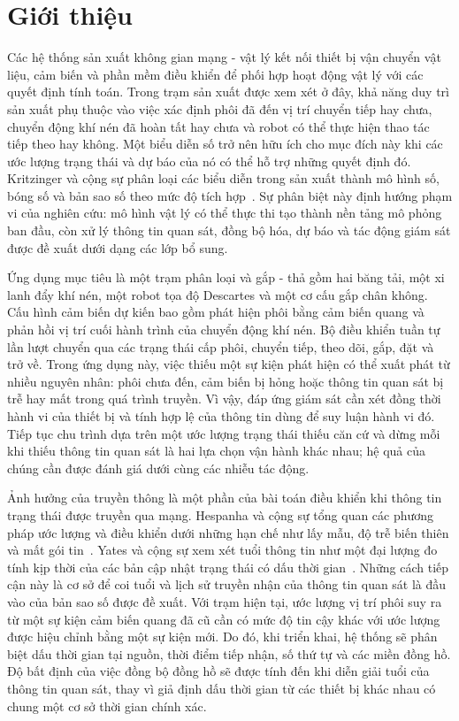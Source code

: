 \section{Giới thiệu}
Các hệ thống sản xuất không gian mạng - vật lý kết nối thiết bị vận chuyển vật liệu, cảm biến và phần mềm điều khiển để phối hợp hoạt động vật lý với các quyết định tính toán. Trong trạm sản xuất được xem xét ở đây, khả năng duy trì sản xuất phụ thuộc vào việc xác định phôi đã đến vị trí chuyển tiếp hay chưa, chuyển động khí nén đã hoàn tất hay chưa và robot có thể thực hiện thao tác tiếp theo hay không. Một biểu diễn số trở nên hữu ích cho mục đích này khi các ước lượng trạng thái và dự báo của nó có thể hỗ trợ những quyết định đó. Kritzinger và cộng sự phân loại các biểu diễn trong sản xuất thành mô hình số, bóng số và bản sao số theo mức độ tích hợp~\cite{Kritzinger2018}. Sự phân biệt này định hướng phạm vi của nghiên cứu: mô hình vật lý có thể thực thi tạo thành nền tảng mô phỏng ban đầu, còn xử lý thông tin quan sát, đồng bộ hóa, dự báo và tác động giám sát được đề xuất dưới dạng các lớp bổ sung.

Ứng dụng mục tiêu là một trạm phân loại và gắp - thả gồm hai băng tải, một xi lanh đẩy khí nén, một robot tọa độ Descartes và một cơ cấu gắp chân không. Cấu hình cảm biến dự kiến bao gồm phát hiện phôi bằng cảm biến quang và phản hồi vị trí cuối hành trình của chuyển động khí nén. Bộ điều khiển tuần tự lần lượt chuyển qua các trạng thái cấp phôi, chuyển tiếp, theo dõi, gắp, đặt và trở về. Trong ứng dụng này, việc thiếu một sự kiện phát hiện có thể xuất phát từ nhiều nguyên nhân: phôi chưa đến, cảm biến bị hỏng hoặc thông tin quan sát bị trễ hay mất trong quá trình truyền. Vì vậy, đáp ứng giám sát cần xét đồng thời hành vi của thiết bị và tính hợp lệ của thông tin dùng để suy luận hành vi đó. Tiếp tục chu trình dựa trên một ước lượng trạng thái thiếu căn cứ và dừng mỗi khi thiếu thông tin quan sát là hai lựa chọn vận hành khác nhau; hệ quả của chúng cần được đánh giá dưới cùng các nhiễu tác động.

Ảnh hưởng của truyền thông là một phần của bài toán điều khiển khi thông tin trạng thái được truyền qua mạng. Hespanha và cộng sự tổng quan các phương pháp ước lượng và điều khiển dưới những hạn chế như lấy mẫu, độ trễ biến thiên và mất gói tin~\cite{Hespanha2007}. Yates và cộng sự xem xét tuổi thông tin như một đại lượng đo tính kịp thời của các bản cập nhật trạng thái có dấu thời gian~\cite{Yates2021}. Những cách tiếp cận này là cơ sở để coi tuổi và lịch sử truyền nhận của thông tin quan sát là đầu vào của bản sao số được đề xuất. Với trạm hiện tại, ước lượng vị trí phôi suy ra từ một sự kiện cảm biến quang đã cũ cần có mức độ tin cậy khác với ước lượng được hiệu chỉnh bằng một sự kiện mới. Do đó, khi triển khai, hệ thống sẽ phân biệt dấu thời gian tại nguồn, thời điểm tiếp nhận, số thứ tự và các miền đồng hồ. Độ bất định của việc đồng bộ đồng hồ sẽ được tính đến khi diễn giải tuổi của thông tin quan sát, thay vì giả định dấu thời gian từ các thiết bị khác nhau có chung một cơ sở thời gian chính xác.

